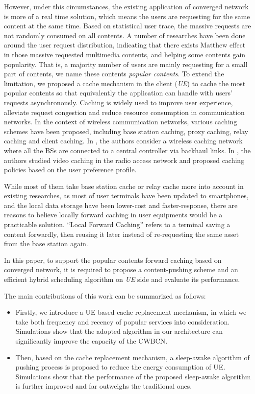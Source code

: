 \documentclass[conference]{IEEEtran}
\begin{document}
However, under this circumstances, the existing application of converged network is more of a real time solution, which means the users are requesting for the same content at the same time. Based on statistical user trace, the massive requests are not randomly consumed on all contents. A number of researches have been done around the user request distribution\cite{cha2007tube}, indicating that there exists Matthew effect in those massive requested multimedia contents, and helping some contents gain popularity\cite{bastug2014living}. That is, a majority number of users are mainly requesting for a small part of contents, we name these contents \emph{popular contents}. To extend the limitation, we proposed a cache mechanism in the client (\emph{UE}) to cache the most popular contents so that equivalently the application can handle with users' requests asynchronously. Caching is widely used to improve user experience, alleviate request congestion and reduce resource consumption in communication networks. In the context of wireless communication networks, various caching schemes have been proposed, including base station caching, proxy caching, relay caching and client caching\cite{bao2012energy}. In \cite{peng2015backhaul}, the authors consider a wireless caching network where all the BSs are connected to a central
controller via backhaul links. In \cite{ahlehagh2014video}, the authors studied video caching in the radio access network and proposed caching policies based on the user preference profile.

While most of them take base station cache or relay cache more into account in existing researches, as most of user terminals have been updated to smartphones, and the local data storage have been lower-cost and faster-response, there are reasons to believe locally forward caching in user equipments would be a practicable solution. ``Local Forward Caching'' refers to a terminal saving a content forwardly, then reusing it later instead of re-requesting the same asset from the base station again. 
 
 
In this paper, to support the popular contents forward caching based on converged network, it is required to propose a content-pushing scheme and an efficient hybrid scheduling algorithm on \emph{UE} side and evaluate its performance.
 
The main contributions of this work can be summarized as follows:
\begin{itemize}
\setlength \itemindent {-1 em}
\item
Firstly, we introduce a UE-based cache replacement mechanism, in which we take both frequency and recency of popular services into consideration. Simulations show that the adopted algorithm in our architecture can significantly improve the capacity of the CWBCN.

\item
Then, based on the cache replacement mechanism, a sleep-awake algorithm of pushing process is proposed to reduce the energy consumption of UE. Simulations show that the performance of the proposed sleep-awake algorithm is further improved and far outweighs the traditional ones.
 \end{itemize}
\end{document}
